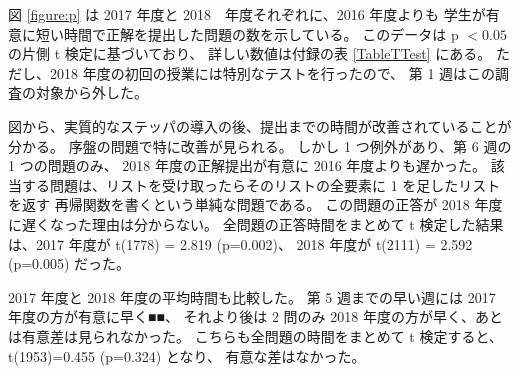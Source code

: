 図 \ref{figure:p} は
2017 年度と 2018　年度それぞれに、2016 年度よりも
学生が有意に短い時間で正解を提出した問題の数を示している。
このデータは p $< 0.05$ の片側 t 検定に基づいており、
詳しい数値は付録の表 \ref{TableTTest} にある。
ただし、2018 年度の初回の授業には特別なテストを行ったので、
第 1 週はこの調査の対象から外した。

図から、実質的なステッパの導入の後、提出までの時間が改善されていることが分かる。
序盤の問題で特に改善が見られる。
しかし 1 つ例外があり、第 6 週の 1 つの問題のみ、
2018 年度の正解提出が有意に 2016 年度よりも遅かった。
該当する問題は、リストを受け取ったらそのリストの全要素に 1 を足したリストを返す
再帰関数を書くという単純な問題である。
この問題の正答が 2018 年度に遅くなった理由は分からない。
全問題の正答時間をまとめて t 検定した結果は、2017 年度が t(1778) = 2.819 (p=0.002)、
2018 年度が t(2111) = 2.592 (p=0.005) だった。

2017 年度と 2018 年度の平均時間も比較した。
第 5 週までの早い週には 2017 年度の方が有意に早く■■、
それより後は 2 問のみ 2018 年度の方が早く、あとは有意差は見られなかった。
こちらも全問題の時間をまとめて t 検定すると、t(1953)=0.455 (p=0.324) となり、
有意な差はなかった。

